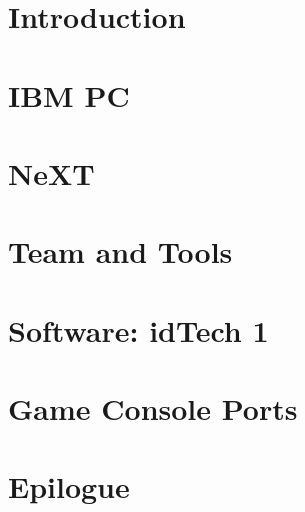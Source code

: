 \documentclass{book}
\begin{document}
    \chapter{Introduction}
      

   
      \chapter{IBM PC}
        
        
        
        
        
        
            

        


        
     \chapter{NeXT}
          


    

    \chapter{Team and Tools}
       
       
       
      
      
      
      
      




     \chapter{Software: idTech 1}
      
      
      
      
       
       
       
       
       
       
       
       
          
        
      

    \chapter{Game Console Ports}        
          

    \chapter*{Epilogue}
      
\end{document}
